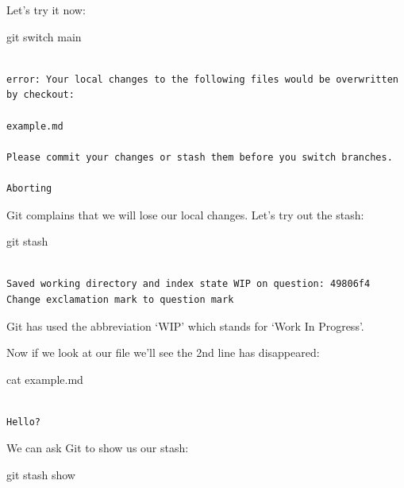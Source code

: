 \documentclass[
  letterpaper,
  DIV=11,
  numbers=noendperiod]{scrartcl}
\newenvironment{Shaded}{\begin{snugshade}}{\end{snugshade}}
\newcommand{\FunctionTok}[1]{\textcolor[rgb]{0.28,0.35,0.67}{#1}}
\newcommand{\NormalTok}[1]{\textcolor[rgb]{0.00,0.23,0.31}{#1}}
\begin{document}
Let's try it now:

\begin{Shaded}
\begin{Highlighting}[]
\FunctionTok{git}\NormalTok{ switch main}
\end{Highlighting}
\end{Shaded}

\begin{verbatim}

error: Your local changes to the following files would be overwritten by checkout:

example.md

Please commit your changes or stash them before you switch branches.

Aborting
\end{verbatim}

Git complains that we will lose our local changes. Let's try out the
stash:

\begin{Shaded}
\begin{Highlighting}[]
\FunctionTok{git}\NormalTok{ stash}
\end{Highlighting}
\end{Shaded}

\begin{verbatim}

Saved working directory and index state WIP on question: 49806f4 Change exclamation mark to question mark
\end{verbatim}

Git has used the abbreviation `WIP' which stands for `Work In Progress'.

Now if we look at our file we'll see the 2nd line has disappeared:

\begin{Shaded}
\begin{Highlighting}[]
\FunctionTok{cat}\NormalTok{ example.md}
\end{Highlighting}
\end{Shaded}

\begin{verbatim}

Hello?
\end{verbatim}

We can ask Git to show us our stash:

\begin{Shaded}
\begin{Highlighting}[]
\FunctionTok{git}\NormalTok{ stash show}
\end{Highlighting}
\end{Shaded}
\end{document}
